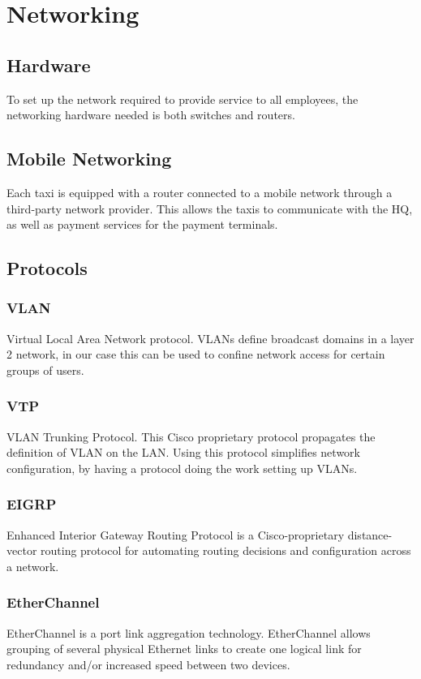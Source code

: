 \section{Networking}
\subsection{Hardware}
To set up the network required to provide service to all employees, the networking hardware needed is both switches and routers. %

\subsection{Mobile Networking}
Each taxi is equipped with a router connected to a mobile network through a third-party network provider.
This allows the taxis to communicate with the HQ, as well as payment services for the payment terminals.

\subsection{Protocols}
\subsubsection{VLAN}
Virtual Local Area Network protocol.
VLANs define broadcast domains in a layer 2 network,\cite{VLAN} in our case this can be used to confine network access for certain groups of users.

\subsubsection{VTP}
VLAN Trunking Protocol.
This Cisco proprietary protocol propagates the definition of VLAN on the LAN.\cite{VTP} 
Using this protocol simplifies network configuration, by having a protocol doing the work setting up VLANs.

\subsubsection{EIGRP}
Enhanced Interior Gateway Routing Protocol is a Cisco-proprietary distance-vector routing protocol for automating routing decisions and configuration across a network. \cite{EIGRP}

\subsubsection{EtherChannel}
EtherChannel is a port link aggregation technology. EtherChannel allows grouping of several physical Ethernet links to create one logical link for redundancy and/or increased speed between two devices. \cite{EtherChannel}